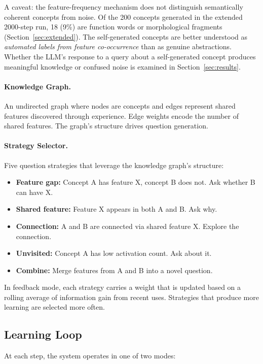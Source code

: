 \documentclass[conference]{IEEEtran}
\begin{document}
A caveat: the feature-frequency mechanism does not distinguish semantically coherent concepts from noise. Of the 200 concepts generated in the extended 2000-step run, 18 (9\%) are function words or morphological fragments (Section~\ref{sec:extended}). The self-generated concepts are better understood as \emph{automated labels from feature co-occurrence} than as genuine abstractions. Whether the LLM's response to a query about a self-generated concept produces meaningful knowledge or confused noise is examined in Section~\ref{sec:results}.

\paragraph{Knowledge Graph.} An undirected graph where nodes are concepts and edges represent shared features discovered through experience. Edge weights encode the number of shared features. The graph's structure drives question generation.

\paragraph{Strategy Selector.} Five question strategies that leverage the knowledge graph's structure:

\begin{itemize}[leftmargin=*]
\item \textbf{Feature gap:} Concept A has feature X, concept B does not. Ask whether B can have X.
\item \textbf{Shared feature:} Feature X appears in both A and B. Ask why.
\item \textbf{Connection:} A and B are connected via shared feature X. Explore the connection.
\item \textbf{Unvisited:} Concept A has low activation count. Ask about it.
\item \textbf{Combine:} Merge features from A and B into a novel question.
\end{itemize}

In feedback mode, each strategy carries a weight that is updated based on a rolling average of information gain from recent uses. Strategies that produce more learning are selected more often.

\subsection{Learning Loop}

At each step, the system operates in one of two modes:
\end{document}

